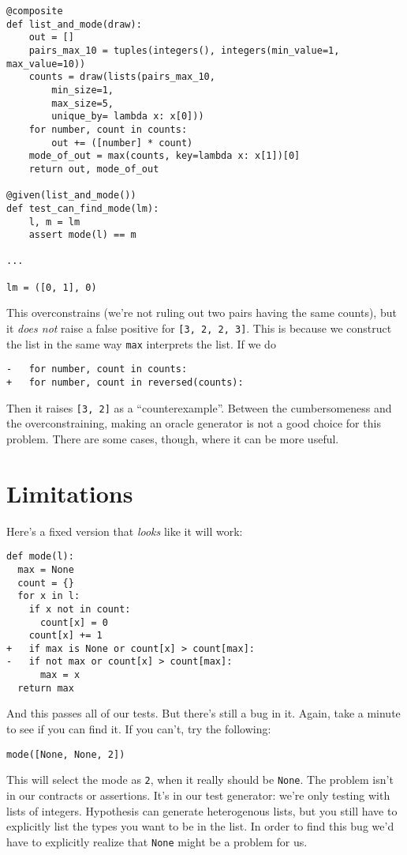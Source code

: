 \begin{verbatim}
@composite
def list_and_mode(draw):
    out = []
    pairs_max_10 = tuples(integers(), integers(min_value=1, max_value=10))
    counts = draw(lists(pairs_max_10, 
        min_size=1,
        max_size=5, 
        unique_by= lambda x: x[0]))
    for number, count in counts:
        out += ([number] * count)
    mode_of_out = max(counts, key=lambda x: x[1])[0]
    return out, mode_of_out

@given(list_and_mode())
def test_can_find_mode(lm):
    l, m = lm
    assert mode(l) == m

...

lm = ([0, 1], 0)
\end{verbatim}
This overconstrains (we're not ruling out two pairs having the same
counts), but it \emph{does not} raise a false positive for
\texttt{{[}3,\ 2,\ 2,\ 3{]}}. This is because we construct the list in
the same way \texttt{max} interprets the list. If we do

\begin{verbatim}
-   for number, count in counts:
+   for number, count in reversed(counts):
\end{verbatim}

Then it raises \texttt{{[}3,\ 2{]}} as a ``counterexample''. Between the
cumbersomeness and the overconstraining, making an oracle generator is
not a good choice for this problem. There are some cases, though, where
it can be more useful.

\section{Limitations}
\label{limitations}

Here's a fixed version that \emph{looks} like it will work:

\begin{verbatim}
def mode(l):
  max = None
  count = {}
  for x in l:
    if x not in count:
      count[x] = 0
    count[x] += 1
+   if max is None or count[x] > count[max]:
-   if not max or count[x] > count[max]:
      max = x
  return max
\end{verbatim}
And this passes all of our tests. But there's still a bug in it. Again,
take a minute to see if you can find it. If you can't, try the
following:

\begin{verbatim}
mode([None, None, 2])
\end{verbatim}
This will select the mode as \texttt{2}, when it really should be
\texttt{None}. The problem isn't in our contracts or assertions. It's in
our test generator: we're only testing with lists of integers.
Hypothesis can generate heterogenous lists, but you still have to
explicitly list the types you want to be in the list. In order to find
this bug we'd have to explicitly realize that \texttt{None} might be a
problem for us.

